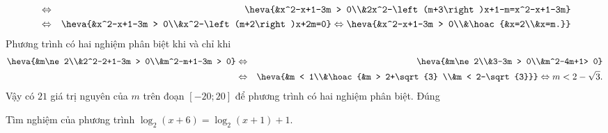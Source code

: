 \begin{ex}
{\begin{itemchoice}
\begin{eqnarray*}
    &\Leftrightarrow&  \heva{&x^2-x+1-3m > 0\\&2x^2-\left(m+3\right)x+1-m=x^2-x+1-3m}\\
    &\Leftrightarrow& \heva{&x^2-x+1-3m > 0\\&x^2-\left(m+2\right)x+2m=0} \Leftrightarrow \heva{&x^2-x+1-3m > 0\\&\hoac{&x=2\\&x=m.}} 
   \end{eqnarray*}
   Phương trình có hai nghiệm phân biệt khi  và chỉ khi
   \begin{eqnarray*}
    \heva{&m\ne 2\\&2^2-2+1-3m > 0\\&m^2-m+1-3m > 0} &\Leftrightarrow& \heva{&m\ne  2\\&3-3m > 0\\&m^2-4m+1> 0}\\
    &\Leftrightarrow& \heva{&m < 1\\&\hoac{&m > 2+\sqrt{3} \\&m < 2-\sqrt{3}}}  \Leftrightarrow m < 2-\sqrt{3}.
   \end{eqnarray*}
   Vậy  có $21$ giá trị nguyên của $m$ trên đoạn $\left[-20;20\right]$ để phương trình có hai nghiệm phân biệt. Đúng
  \end{itemchoice}
 } 
\end{ex}



\begin{ex}%
	Tìm  nghiệm của phương trình $\log_2 \left(x+6\right)=\log_2 (x+1)+1$.
\end{ex}


